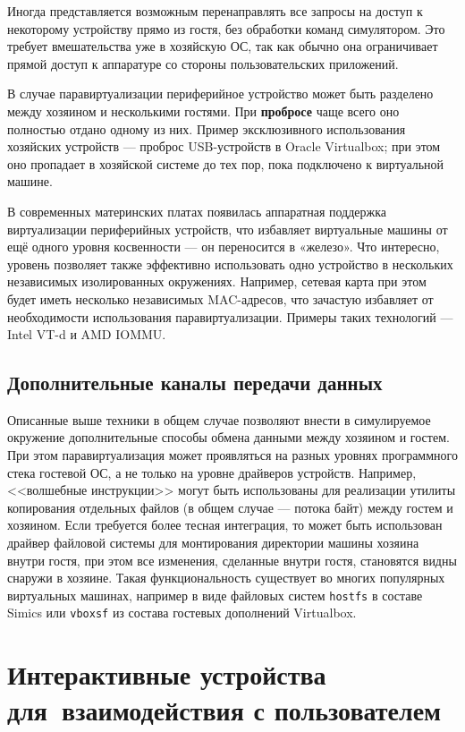 Иногда представляется возможным перенаправлять все запросы на доступ к некоторому устройству прямо из гостя, без обработки команд симулятором. Это требует вмешательства уже в хозяйскую ОС, так как обычно она ограничивает  прямой доступ к аппаратуре со стороны пользовательских приложений.

В случае паравиртуализации периферийное устройство может быть разделено между хозяином и несколькими гостями. При \textbf{пробросе} чаще всего оно полностью отдано одному из них. Пример эксклюзивного использования хозяйских устройств --- проброс USB-устройств в Oracle Virtualbox; при этом оно пропадает в хозяйской системе до тех пор, пока подключено к виртуальной машине.

В современных материнских платах появилась аппаратная поддержка виртуализации периферийных устройств, что избавляет виртуальные машины от ещё одного уровня косвенности --- он переносится в «железо». Что интересно, уровень позволяет также эффективно использовать одно устройство в нескольких независимых изолированных окружениях. Например, сетевая карта при этом будет иметь несколько независимых MAC-адресов, что зачастую избавляет от необходимости использования паравиртуализации. Примеры таких технологий --- Intel VT-d и AMD IOMMU.

\subsection{Дополнительные каналы передачи данных}

Описанные выше техники в общем случае позволяют внести в симулируемое окружение дополнительные способы обмена данными между хозяином и гостем. При этом паравиртуализация может проявляться на разных уровнях программного стека гостевой ОС, а не только на уровне драйверов устройств. Например, <<волшебные инструкции>> могут быть использованы для реализации утилиты копирования  отдельных файлов (в общем случае --- потока байт) между гостем и хозяином. Если требуется более тесная интеграция, то может быть использован драйвер файловой системы для монтирования директории машины хозяина внутри гостя, при этом все изменения, сделанные внутри гостя, становятся видны снаружи в хозяине. Такая функциональность существует во многих популярных виртуальных машинах, например в виде файловых систем \texttt{hostfs} в составе Simics или \texttt{vboxsf} из состава гостевых дополнений Virtualbox.

\section[Интерактивные устройства]{Интерактивные устройства для~взаимодействия с пользователем}

